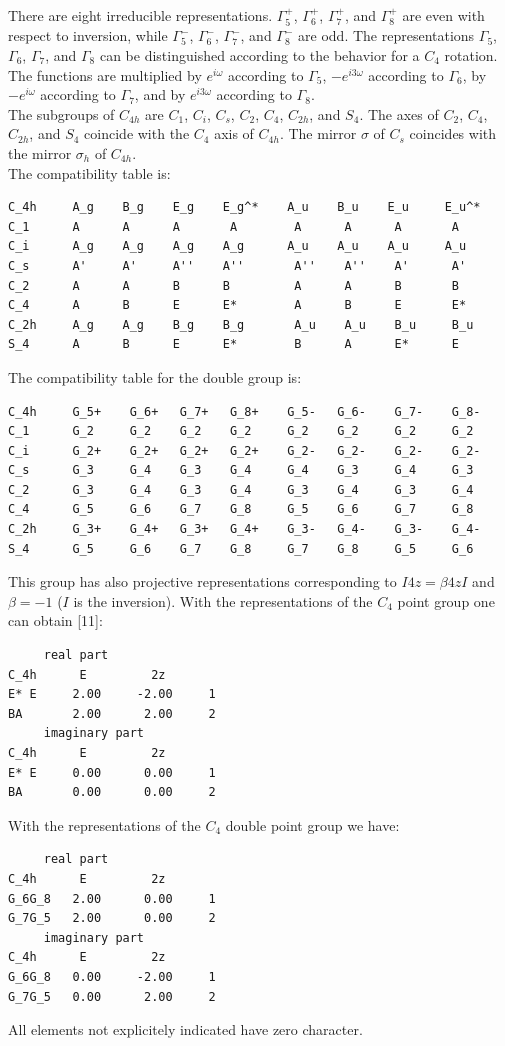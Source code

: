 \documentclass[12pt,a4paper]{article}
\begin{document}
There are eight irreducible representations. $\Gamma_5^+$, $\Gamma_6^+$,
$\Gamma_7^+$, and $\Gamma_8^+$ are even with respect to inversion, while
$\Gamma_5^-$, $\Gamma_6^-$, $\Gamma_7^-$, and $\Gamma_8^-$ are odd.
The representations $\Gamma_5$, $\Gamma_6$, $\Gamma_7$, and $\Gamma_8$ can
be distinguished according to the behavior for a $C_4$ rotation. The
functions are multiplied by $e^{i\omega}$ according to $\Gamma_5$,
$-e^{i3\omega}$ according to $\Gamma_6$, by $-e^{i\omega}$ according to
$\Gamma_7$, and by $e^{i3\omega}$ according to $\Gamma_8$.\\
The subgroups of $C_{4h}$ are $C_1$, $C_i$, $C_s$, $C_2$, $C_4$, $C_{2h}$,
and $S_4$.  The axes of $C_2$, $C_4$, $C_{2h}$, and $S_4$
coincide with the $C_4$ axis of $C_{4h}$.
The mirror $\sigma$ of $C_s$ coincides with the mirror $\sigma_h$ of $C_{4h}$. \\
The compatibility table is:
\begin{verbatim}
C_4h     A_g    B_g    E_g    E_g^*    A_u    B_u    E_u     E_u^*
C_1      A      A      A       A        A      A      A       A
C_i      A_g    A_g    A_g    A_g      A_u    A_u    A_u     A_u
C_s      A'     A'     A''    A''       A''    A''    A'      A'
C_2      A      A      B      B         A      A      B       B
C_4      A      B      E      E*        A      B      E       E*
C_2h     A_g    A_g    B_g    B_g       A_u    A_u    B_u     B_u
S_4      A      B      E      E*        B      A      E*      E 
\end{verbatim}
The compatibility table for the double group is:
\begin{verbatim}
C_4h     G_5+    G_6+   G_7+   G_8+    G_5-   G_6-    G_7-    G_8-
C_1      G_2     G_2    G_2    G_2     G_2    G_2     G_2     G_2
C_i      G_2+    G_2+   G_2+   G_2+    G_2-   G_2-    G_2-    G_2-     
C_s      G_3     G_4    G_3    G_4     G_4    G_3     G_4     G_3
C_2      G_3     G_4    G_3    G_4     G_3    G_4     G_3     G_4
C_4      G_5     G_6    G_7    G_8     G_5    G_6     G_7     G_8
C_2h     G_3+    G_4+   G_3+   G_4+    G_3-   G_4-    G_3-    G_4-
S_4      G_5     G_6    G_7    G_8     G_7    G_8     G_5     G_6
\end{verbatim}
This group has also projective representations corresponding to
$I 4z = \beta 4z I$ and $\beta=-1$ ($I$ is the inversion).
With the representations of the $C_4$ point group one can obtain [11]:
\begin{verbatim}
     real part
C_4h      E         2z
E* E     2.00     -2.00     1
BA       2.00      2.00     2
     imaginary part
C_4h      E         2z
E* E     0.00      0.00     1
BA       0.00      0.00     2
\end{verbatim}
With the representations of the $C_4$ double point group we have:
\begin{verbatim}
     real part
C_4h      E         2z
G_6G_8   2.00      0.00     1
G_7G_5   2.00      0.00     2
     imaginary part
C_4h      E         2z
G_6G_8   0.00     -2.00     1
G_7G_5   0.00      2.00     2
\end{verbatim}
All elements not explicitely indicated have zero character.
\end{document}
